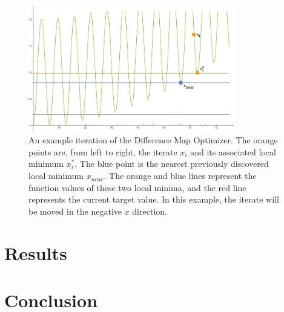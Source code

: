 \documentclass[12pt]{article}
\begin{document}
    \begin{figure}
        \begin{center}
            \includegraphics[width=0.8\textwidth]{../figures/iteratingnew.png}
            \caption{An example iteration of the Difference Map Optimizer.
                The orange points are, from left to right, the iterate $x_i$
                and its associated local minimum $x_i^*$. The blue point is the
                nearest previously discovered local minimum $x_{near}$.
                The orange and blue lines represent the function values of
                these two local minima, and the red line represents the current
                target value. In this example, the iterate will be moved in the
                negative $x$ direction.}
        \end{center}
    \end{figure}

\section{Results}

\section{Conclusion}

\pagebreak



\end{document}

